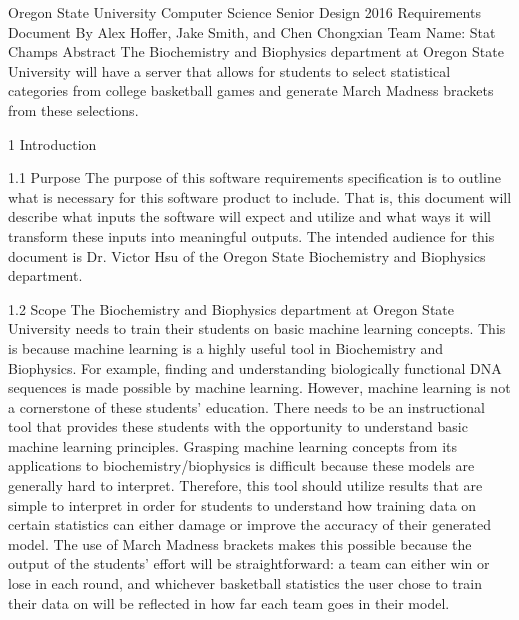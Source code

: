 \documentclass[letterpaper, 10pt,titlepage]{article}
\begin{document}
\begin{center}

Oregon State University Computer Science Senior Design 2016
\bigbreak
Requirements Document
\bigbreak
By Alex Hoffer, Jake Smith, and Chen Chongxian
\bigbreak
Team Name: Stat Champs
\bigbreak
\vspace{3.0cm}
 Abstract
\bigbreak
The Biochemistry and Biophysics department at Oregon State University will have a server that allows for students to select statistical categories from college basketball games and generate March Madness brackets from these selections.
\newpage
\end{center}

\tableofcontents

\newpage

\begin{section}{1 Introduction}


\begin{subsection}{1.1 Purpose}
The purpose of this software requirements specification is to outline what is necessary for this software product to include. That is, this document will describe what inputs the software will expect and utilize and what ways it will transform these inputs into meaningful outputs. The intended audience for this document is Dr. Victor Hsu of the Oregon State Biochemistry and Biophysics department.
\end{subsection}


\begin{subsection}{1.2 Scope}
The Biochemistry and Biophysics department at Oregon State University needs to train their students on basic machine learning concepts. This is because machine learning is a highly useful tool in Biochemistry and Biophysics. For example, finding and understanding biologically functional DNA sequences is made possible by machine learning. However, machine learning is not a cornerstone of these students’ education. There needs to be an instructional tool that provides these students with the opportunity to understand basic machine learning principles. Grasping machine learning concepts from its applications to biochemistry/biophysics is difficult because these models are generally hard to interpret. Therefore, this tool should utilize results that are simple to interpret in order for students to understand how training data on certain statistics can either damage or improve the accuracy of their generated model. The use of March Madness brackets makes this possible because the output of the students’ effort will be straightforward: a team can either win or lose in each round, and whichever basketball statistics the user chose to train their data on will be reflected in how far each team goes in their model.
\end{subsection}


\end{section}
\end{document}
